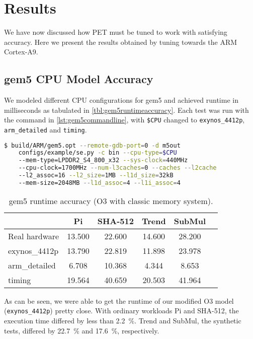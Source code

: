 \section{Results}

We have now discussed how PET must be tuned to work with satisfying accuracy.
Here we present the results obtained by tuning towards the ARM Cortex-A9.

\subsection{gem5 CPU Model Accuracy}

We modeled different CPU configurations for gem5 and achieved runtime in
milliseconds as tabulated in \autoref{tbl:gem5runtimeaccuracy}. Each test was
run with the command in \autoref{lst:gem5commandline}, with \texttt{\$CPU}
changed to \texttt{exynos\_4412p}, \texttt{arm\_detailed} and \texttt{timing}.

\begin{lstlisting}[float=htb,language=sh,numbers=none,label={lst:gem5commandline},caption={gem5
Command Line.}]
$ build/ARM/gem5.opt --remote-gdb-port=0 -d m5out
    configs/example/se.py -c bin --cpu-type=$CPU
    --mem-type=LPDDR2_S4_800_x32 --sys-clock=440MHz
    --cpu-clock=1700MHz --num-l3caches=0 --caches --l2cache
    --l2_assoc=16 --l2_size=1MB --l1d_size=32kB
    --mem-size=2048MB --l1d_assoc=4 --l1i_assoc=4
\end{lstlisting}

\begin{table}[ht]
\centering
\begin{tabular}{|l|c|c|c|c|c|}
\hline
                & Pi      & SHA-512 & Trend   & SubMul \\
\hline
Real hardware   & 13.500  & 22.600  & 14.600  & 28.200 \\
exynos\_4412p   & 13.790  & 22.819  & 11.898  & 23.978 \\
arm\_detailed   &  6.708  & 10.368  &  4.344  &  8.653 \\
timing          & 19.564  & 40.659  & 20.503  & 41.964 \\
\hline
\end{tabular}
\caption{gem5 runtime accuracy (O3 with classic memory system).}
\label{tbl:gem5runtimeaccuracy}
\end{table}

As can be seen, we were able to get the runtime of our modified O3
model (\texttt{exynos\_4412p}) pretty close. With ordinary workloads Pi and
SHA-512, the execution time differed by less
than 2.2~\%. Trend and SubMul, the synthetic tests, differed by 22.7~\% and
17.6~\%, respectively.


